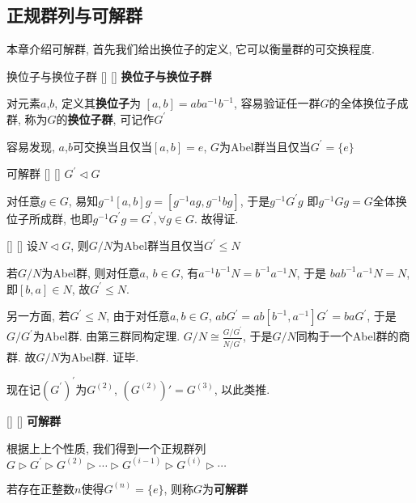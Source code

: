 \documentclass[UTF8]{ctexart}
\begin{document}
	\subsection{正规群列与可解群}
        本章介绍可解群, 首先我们给出换位子的定义, 它可以衡量群的可交换程度.
        
        \begin{dfn}
            []
            {换位子与换位子群}
            []
            []
            \textbf{换位子与换位子群}
            
            对元素$a$,$b$, 定义其\textbf{换位子}为
            $[a,b]=aba^{-1}b^{-1}$, 容易验证任一群$G$的全体换位子成群, 称为$G$的\textbf{换位子群}, 
            可记作$G^\prime$
        \end{dfn}
        
        容易发现, $a$,$b$可交换当且仅当$[a,b]=e$, $G$为Abel群当且仅当$G^\prime=\{e\}$
        
        \begin{ppt}
            []
            {可解群}
            []
            []
            $G^\prime\triangleleft G$
        \end{ppt}

        \begin{prf}
            对任意$g\in G$, 易知$g^{-1}[a,b]g=[g^{-1}ag,g^{-1}bg]$, 于是$g^{-1}G^\prime g$
            即$g^{-1}Gg=G$全体换位子所成群, 也即$g^{-1}G^\prime g=G^\prime,\forall g\in G$. 故得证.
        \end{prf}
        
        \begin{ppt}
            []
            {}
            []
            []
            设$N\triangleleft G$, 则$G/N$为Abel群当且仅当$G^\prime \leq N$
       \end{ppt}

        \begin{prf}
            若$G/N$为Abel群, 则对任意$a$, $b\in G$, 有$a^{-1}b^{-1}N=b^{-1}a^{-1}N$, 于是
            $bab^{-1}a^{-1}N=N$, 即$[b,a]\in N$, 故$G^\prime\leq N$. 

            另一方面, 若$G^\prime \leq N$, 由于对任意$a,b\in G$, 
            $abG^\prime=ab[b^{-1}, a^{-1}]G^\prime=baG^\prime$, 于是$G/G^{\prime}$为Abel群.
            由第三群同构定理. 
            $G/N\cong\frac{G/G^\prime}{N/G^\prime}$, 于是$G/N$同构于一个Abel群的商群. 
            故$G/N$为Abel群. 证毕.
        \end{prf}

        现在记$(G^\prime)^\prime$为$G^{(2)}$, $(G^{(2)})\prime=G^{(3)}$, 以此类推.
        \begin{dfn}
            []
            {}
            []
            []
            \textbf{可解群}
            
            根据上上个性质, 我们得到一个正规群列
            $G\triangleright G^\prime \triangleright G^{(2)}\triangleright\cdots\triangleright
            G^{(i-1)}\triangleright G^{(i)}\triangleright\cdots$

            若存在正整数$n$使得$G^{(n)}=\{e\}$, 则称$G$为\textbf{可解群}
           \end{dfn}
\end{document}
